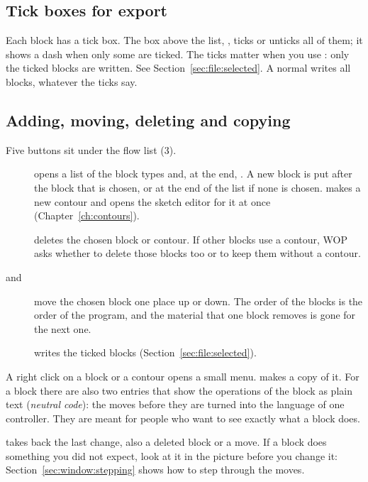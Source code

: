 \subsection{Tick boxes for export}
Each block has a tick box. The box above the list, , ticks or unticks all of them; it shows a dash when only some are ticked. The ticks matter when you use : only the ticked blocks are written. See Section~\ref{sec:file:selected}. A normal  writes all blocks, whatever the ticks say.

\subsection{Adding, moving, deleting and copying}\label{sec:window:buttons}
Five buttons sit under the flow list (3).

\begin{description}
\item[] opens a list of the block types and, at the end, . A new block is put after the block that is chosen, or at the end of the list if none is chosen.  makes a new contour and opens the sketch editor for it at once (Chapter~\ref{ch:contours}).
\item[] deletes the chosen block or contour. If other blocks use a contour, WOP asks whether to delete those blocks too or to keep them without a contour.
\item[ and ] move the chosen block one place up or down. The order of the blocks is the order of the program, and the material that one block removes is gone for the next one.
\item[] writes the ticked blocks (Section~\ref{sec:file:selected}).
\end{description}

A right click on a block or a contour opens a small menu.  makes a copy of it. For a block there are also two entries that show the operations of the block as plain text (\emph{neutral code}): the moves before they are turned into the language of one controller. They are meant for people who want to see exactly what a block does.

\begin{tipbox}
 takes back the last change, also a deleted block or a move. If a block does something you did not expect, look at it in the picture before you change it: Section~\ref{sec:window:stepping} shows how to step through the moves.
\end{tipbox}

